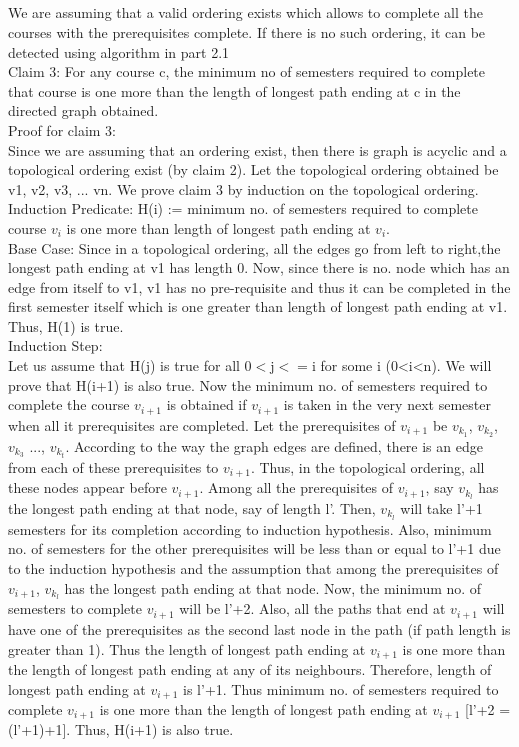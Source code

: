\documentclass{article}
\begin{document}
\subsection{}
We are assuming that a valid ordering exists which allows to complete all the courses with the prerequisites complete. If there is no such ordering, it can be detected using algorithm in part 2.1\\
Claim 3: For any course c, the minimum no of semesters required to complete that course is one more than the length of longest path ending at c in the directed graph obtained.\\
Proof for claim 3:\\
Since we are assuming that an ordering exist, then there is graph is acyclic and a topological ordering exist (by claim 2). Let the topological ordering obtained be v1, v2, v3, ... vn. We prove claim 3 by induction on the topological ordering.\\
Induction Predicate: H(i) := minimum no. of semesters required to complete course $v_i$ is one more than length of longest path ending at $v_i$.\\
Base Case: Since in a topological ordering, all the edges go from left to right,the longest path ending at v1 has length 0. Now, since there is no. node which has an edge from itself to v1, v1 has no pre-requisite and thus it can be completed in the first semester itself which is one greater than length of longest path ending at v1. Thus, H(1) is true.\\
Induction Step:\\
Let us assume that H(j) is true for all 0$<$j$<=$i for some i (0<i<n). We will prove that H(i+1) is also true. Now the minimum no. of semesters required to complete the course $v_{i+1}$ is obtained if $v_{i+1}$ is taken in the very next semester when all it prerequisites are completed. Let the prerequisites of $v_{i+1}$ be $v_{k_{1}}$, $v_{k_{2}}$, $v_{k_{3}}$ ..., $v_{k_{t}}$. According to the way the graph edges are defined, there is an edge from each of these prerequisites to $v_{i+1}$. Thus, in the topological ordering, all these nodes appear before $v_{i+1}$. Among all the prerequisites of $v_{i+1}$, say $v_{k_l}$ has the longest path ending at that node, say of length l'. Then, $v_{k_l}$ will take l'+1 semesters for its completion according to induction hypothesis. Also, minimum no. of semesters for the other prerequisites will be less than or equal to l'+1 due to the induction hypothesis and the assumption that among the prerequisites of $v_{i+1}$, $v_{k_l}$ has the longest path ending at that node. Now, the minimum no. of semesters to complete $v_{i+1}$ will be l'+2. Also, all the paths that end at $v_{i+1}$ will have one of the prerequisites as the second last node in the path (if path length is greater than 1). Thus the length of longest path ending at $v_{i+1}$ is one more than the length of longest path ending at any of its neighbours. Therefore, length of longest path ending at $v_{i+1}$ is l'+1. Thus minimum no. of semesters required to complete $v_{i+1}$ is one more than the length of longest path ending at $v_{i+1}$ [l'+2 = (l'+1)+1]. Thus, H(i+1) is also true.\\
\end{document}
